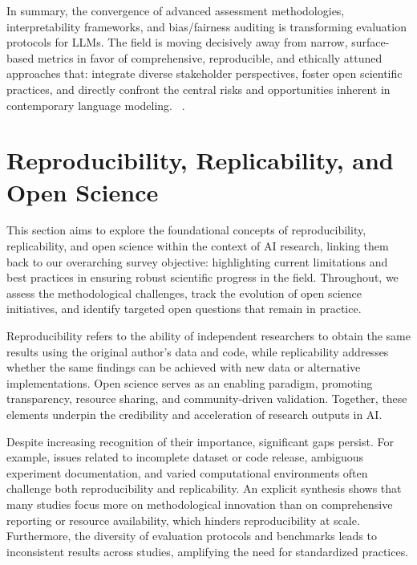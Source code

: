 \documentclass[sigconf]{acmart}
\begin{document}
In summary, the convergence of advanced assessment methodologies, interpretability frameworks, and bias/fairness auditing is transforming evaluation protocols for LLMs. The field is moving decisively away from narrow, surface-based metrics in favor of comprehensive, reproducible, and ethically attuned approaches that:
integrate diverse stakeholder perspectives,
foster open scientific practices, and
directly confront the central risks and opportunities inherent in contemporary language modeling.
~\cite{ref1, ref3, ref10, ref14, ref19, ref35, ref36, ref43, ref45, ref46, ref49, ref52, ref65, ref73, ref76, ref81, ref83, ref84, ref85, ref91, ref94, ref95, ref101, ref104, ref106, ref108}.

\section{Reproducibility, Replicability, and Open Science}

This section aims to explore the foundational concepts of reproducibility, replicability, and open science within the context of AI research, linking them back to our overarching survey objective: highlighting current limitations and best practices in ensuring robust scientific progress in the field. Throughout, we assess the methodological challenges, track the evolution of open science initiatives, and identify targeted open questions that remain in practice.

Reproducibility refers to the ability of independent researchers to obtain the same results using the original author's data and code, while replicability addresses whether the same findings can be achieved with new data or alternative implementations. Open science serves as an enabling paradigm, promoting transparency, resource sharing, and community-driven validation. Together, these elements underpin the credibility and acceleration of research outputs in AI.

Despite increasing recognition of their importance, significant gaps persist. For example, issues related to incomplete dataset or code release, ambiguous experiment documentation, and varied computational environments often challenge both reproducibility and replicability. An explicit synthesis shows that many studies focus more on methodological innovation than on comprehensive reporting or resource availability, which hinders reproducibility at scale. Furthermore, the diversity of evaluation protocols and benchmarks leads to inconsistent results across studies, amplifying the need for standardized practices. 
\end{document}
